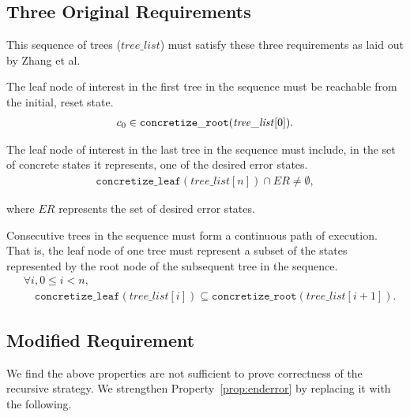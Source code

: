 \subsection{Three Original Requirements} This sequence of trees ($\mathit{tree\_list}$)
must satisfy these three requirements as laid out by Zhang et al.
\setcounter{property}{0}
\renewcommand{\theproperty}{Z.\arabic{property}}
\begin{property}
  \label{prop:startinit} The leaf node of interest in the first tree in the
  sequence must be reachable from the initial, reset state.
  \begin{align*}
    c_0 \in \mathtt{concretize\_root}(\mathit{tree\_list}[0]).
  \end{align*}
\end{property}

\begin{property}
  \label{prop:enderror} The leaf node of interest in the last tree in the
  sequence must include, in the set of concrete states it represents, one of the
  desired error states. 
  \begin{align*}
    \mathtt{concretize\_leaf}(\mathit{tree\_list}[n]) \cap \mathit{ER} \neq
    \emptyset,
  \end{align*}
\end{property}
where $\mathit{ER}$ represents the set of desired error states.

\begin{property}
  \label{prop:stitch}
  Consecutive trees in the sequence must form a continuous path of
  execution. That is, the leaf node of one tree must represent a subset of the
  states represented by the root node of the subsequent tree in the sequence.
  \begin{align*}
    &\forall i, 0 \le i < n,\\
    &\quad\mathtt{concretize\_leaf}(\mathit{tree\_list}[i]) \subseteq
\mathtt{concretize\_root}(\mathit{tree\_list}[i+1]).
\end{align*}

\end{property}

\subsection{Modified Requirement}
We find the above properties are not sufficient to prove correctness of the
recursive strategy. We strengthen Property~\ref{prop:enderror} by replacing it with the following.

